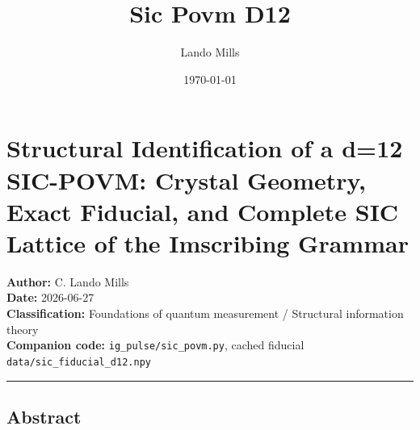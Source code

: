 \documentclass[12pt,a4paper]{article}
\title{Sic Povm D12}
\date{\today}
\author{Lando Mills}
\begin{document}
\maketitle
\hypertarget{structural-identification-of-a-d12-sic-povm-crystal-geometry-exact-fiducial-and-complete-sic-lattice-of-the-imscribing-grammar}{%
\section{Structural Identification of a d=12 SIC-POVM: Crystal Geometry,
Exact Fiducial, and Complete SIC Lattice of the Imscribing
Grammar}\label{structural-identification-of-a-d12-sic-povm-crystal-geometry-exact-fiducial-and-complete-sic-lattice-of-the-imscribing-grammar}}

\textbf{Author:} C. Lando Mills\\
\textbf{Date:} 2026-06-27\\
\textbf{Classification:} Foundations of quantum measurement / Structural
information theory\\
\textbf{Companion code:} \texttt{ig\_pulse/sic\_povm.py}, cached
fiducial \texttt{data/sic\_fiducial\_d12.npy}

\begin{center}\rule{0.5\linewidth}{0.5pt}\end{center}

\hypertarget{abstract}{%
\subsection{Abstract}\label{abstract}}
\end{document}
